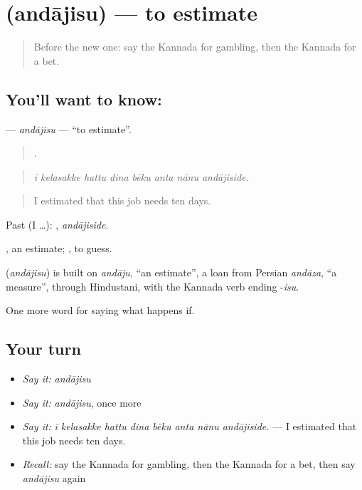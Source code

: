 \section[\texorpdfstring{\kn{ಅಂದಾಜಿಸು} (andājisu)}{ಅಂದಾಜಿಸು (andājisu)}]{ (andājisu) — to estimate}

\label{lesson:KA-C413-andajisu}



\begin{quote}
Before the new one: say the Kannada for gambling, then the Kannada for a bet.
\end{quote}

\subsection*{You'll want to know: }
\textbf{} — \emph{andājisu} — \textquotedblleft{}to estimate\textquotedblright{}.

\begin{quote}
       .
\end{quote}

\begin{quote}
\emph{ī kelasakke hattu dina bēku anta nānu andājiside.}
\end{quote}

\begin{quote}
I estimated that this job needs ten days.
\end{quote}

Past (I …): , \emph{andājiside}.

, an estimate;  , to guess.

\begin{cousinweb}
\textbf{} (\emph{andājisu}) is built on \emph{andāju}, \textquotedblleft{}an estimate\textquotedblright{}, a loan from Persian \emph{andāza}, \textquotedblleft{}a measure\textquotedblright{}, through Hindustani, with the Kannada verb ending -\emph{isu}.
\end{cousinweb}

\begin{grammarlens}[title={What you've built}]
One more word for saying what happens if.
\end{grammarlens}

\subsection*{Your turn}
\begin{itemize}
\raggedright
  \item \emph{Say it:} \emph{andājisu}
  \item \emph{Say it:} \emph{andājisu}, once more
  \item \emph{Say it:} \emph{ī kelasakke hattu dina bēku anta nānu andājiside.} — I estimated that this job needs ten days.
  \item \emph{Recall:} say the Kannada for gambling, then the Kannada for a bet, then say \emph{andājisu} again
\end{itemize}

